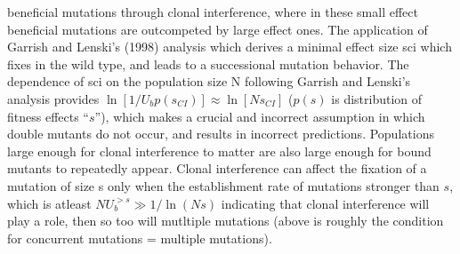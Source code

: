 \documentclass[12pt, one column]{article}
\begin{document}
 beneficial mutations through clonal interference, where in these small effect beneficial mutations are outcompeted by large effect ones.  The application of Garrish and Lenski's (1998) analysis which derives a minimal effect size sci which fixes in the wild type, and leads to a successional mutation behavior.  The dependence of sci on the population size N following Garrish and Lenski's analysis provides $\ln[1/U_b p(s_{CI})]\approx \ln[Ns_{CI}]$ ($p(s)$ is distribution of fitness effects “$s$”), which makes a crucial and incorrect assumption in which double mutants do not occur, and results in incorrect predictions. Populations large enough for clonal interference to matter are also large enough for bound mutants to repeatedly appear.  Clonal interference can affect the fixation of a mutation of size s only when the establishment rate of  mutations stronger than $s$, which is atleast $NU_b^{>s} \gg 1/\ln(Ns)$ indicating that clonal interference will play a role, then so too will mutltiple mutations (above is roughly the condition for concurrent mutations = multiple mutations). 



\end{document}
